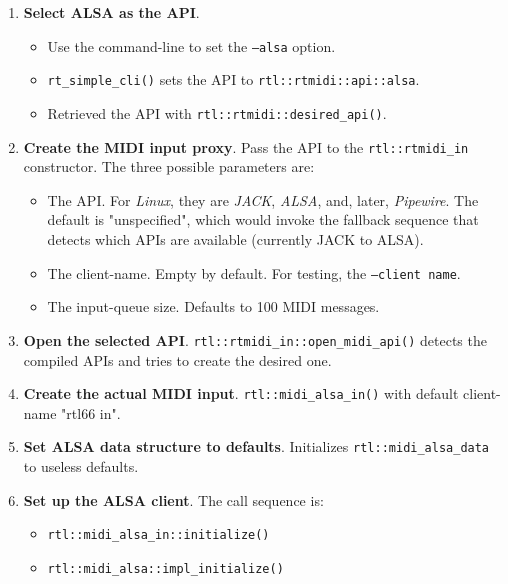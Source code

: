    \begin{enumerate}
      \item \textbf{Select ALSA as the API}.
         \begin{itemize}
            \item Use the command-line to set the \texttt{--alsa} option.
            \item \texttt{rt\_simple\_cli()} sets the API to
               \texttt{rtl::rtmidi::api::alsa}.
            \item Retrieved the API with \texttt{rtl::rtmidi::desired\_api()}.
         \end{itemize}
      \item\textbf{Create the MIDI input proxy}.
         Pass the API to the
         \texttt{rtl::rtmidi\_in} constructor.
         The three possible parameters are:
         \begin{itemize}
            \item The API.  For \textsl{Linux}, they are
               \textsl{JACK}, \textsl{ALSA}, and,
               later, \textsl{Pipewire}. The default is "unspecified",
               which would invoke the fallback sequence that
               detects which APIs are available (currently
               JACK to ALSA).
            \item The client-name. Empty by default. For testing,
               the \texttt{--client name}.
            \item The input-queue size. Defaults to 100 MIDI messages.
         \end{itemize}
      \item\textbf{Open the selected API}.
         \texttt{rtl::rtmidi\_in::open\_midi\_api()} detects the compiled
         APIs and tries to create the desired one.
      \item\textbf{Create the actual MIDI input}.
         \texttt{rtl::midi\_alsa\_in()} with default client-name "rtl66 in".
      \item\textbf{Set ALSA data structure to defaults}.
         Initializes \texttt{rtl::midi\_alsa\_data} to useless defaults.
      \item\textbf{Set up the ALSA client}.
         The call sequence is:
         \begin{itemize}
            \item \texttt{rtl::midi\_alsa\_in::initialize()}
            \item \texttt{rtl::midi\_alsa::impl\_initialize()}
         \end{itemize}

\end{enumerate}
